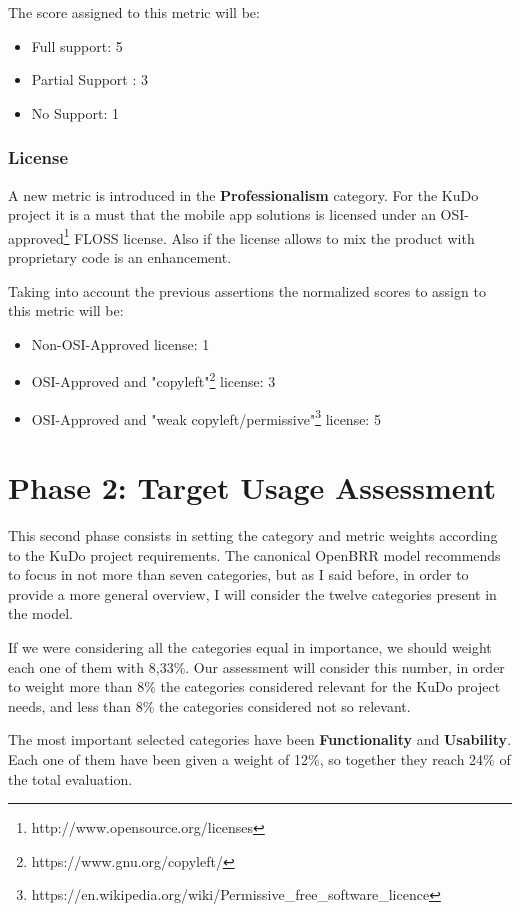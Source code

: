 \documentclass[a4paper,12pt]{book}
\begin{document}
The score assigned to this metric will be:
\begin{itemize}
 \item Full support: 5
  \item Partial Support : 3
 \item No Support: 1
\end{itemize}

\subsubsection{License}
\label{License}

A new metric is introduced in the \textbf{Professionalism} category. For the KuDo project it is a must that the mobile app solutions is licensed under an OSI-approved\footnote{http://www.opensource.org/licenses} FLOSS license. Also if the license allows to mix the product with proprietary code is an enhancement.

Taking into account the previous assertions the normalized scores to assign to this metric will be:
\begin{itemize}
 \item Non-OSI-Approved license: 1
 \item OSI-Approved and "copyleft"\footnote{https://www.gnu.org/copyleft/} license: 3
 \item OSI-Approved and "weak copyleft/permissive"\footnote{https://en.wikipedia.org/wiki/Permissive\_free\_software\_licence}  license: 5
\end{itemize}

\section{Phase 2: Target Usage Assessment}
\label{sec:phase2}
This second phase consists in setting the category and metric weights according to the KuDo project requirements. The canonical OpenBRR model recommends to focus in not more than seven categories, but as I said before, in order to provide a more general overview, I will consider the twelve categories present in the model.

If we were considering all the categories equal in importance, we should weight each one of them with 8,33\%. Our assessment will consider this number, in order to weight more than 8\% the categories considered relevant for the KuDo project needs, and less than 8\% the categories considered not so relevant.

The most important selected categories have been \textbf{Functionality} and \textbf{Usability}. Each one of them have been given a weight of 12\%, so together they reach 24\% of the total evaluation.
\end{document}
